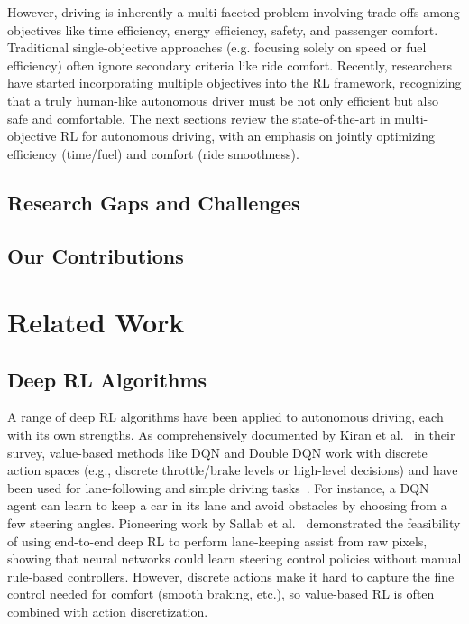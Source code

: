 \documentclass[12pt,a4paper]{article}
\begin{document}
However, driving is inherently a multi-faceted problem involving trade-offs among objectives like time efficiency, energy efficiency, safety, and passenger comfort. Traditional single-objective approaches (e.g. focusing solely on speed or fuel efficiency) often ignore secondary criteria like ride comfort. Recently, researchers have started incorporating multiple objectives into the RL framework, recognizing that a truly human-like autonomous driver must be not only efficient but also safe and comfortable. The next sections review the state-of-the-art in multi-objective RL for autonomous driving, with an emphasis on jointly optimizing efficiency (time/fuel) and comfort (ride smoothness).

\subsection{Research Gaps and Challenges}


\subsection{Our Contributions}


\section{Related Work}

\subsection{Deep RL Algorithms}
A range of deep RL algorithms have been applied to autonomous driving, each with its own strengths. As comprehensively documented by Kiran et al.~\cite{kiran2022} in their survey, value-based methods like DQN and Double DQN work with discrete action spaces (e.g., discrete throttle/brake levels or high-level decisions) and have been used for lane-following and simple driving tasks~\cite{hossain2023}. For instance, a DQN agent can learn to keep a car in its lane and avoid obstacles by choosing from a few steering angles. Pioneering work by Sallab et al.~\cite{sallab2016} demonstrated the feasibility of using end-to-end deep RL to perform lane-keeping assist from raw pixels, showing that neural networks could learn steering control policies without manual rule-based controllers. However, discrete actions make it hard to capture the fine control needed for comfort (smooth braking, etc.), so value-based RL is often combined with action discretization.
\end{document}
